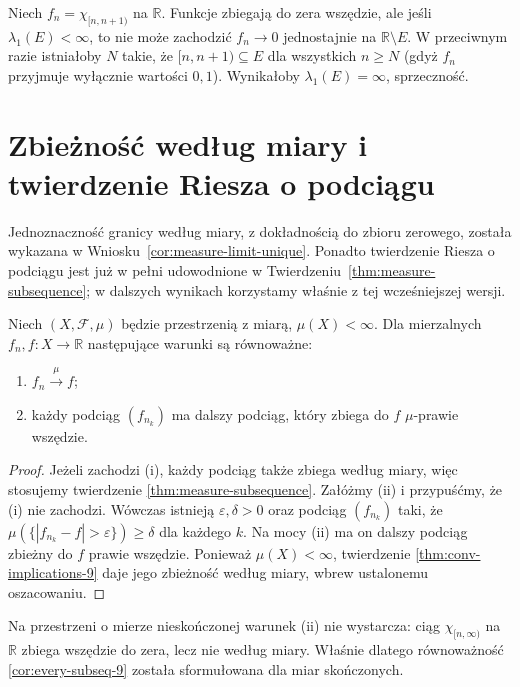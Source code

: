 \begin{przyklad}
Niech $f_n=\chi_{[n,n+1)}$ na $\mathbb R$.
Funkcje zbiegają do zera wszędzie, ale jeśli
$\lambda_1(E)<\infty$, to nie może zachodzić
$f_n\to0$ jednostajnie na $\mathbb R\setminus E$.
W przeciwnym razie istniałoby $N$ takie, że
$[n,n+1)\subseteq E$ dla wszystkich $n\ge N$
(gdyż $f_n$ przyjmuje wyłącznie wartości $0,1$).
Wynikałoby $\lambda_1(E)=\infty$, sprzeczność.
\end{przyklad}

\section{Zbieżność według miary i twierdzenie Riesza o podciągu}

Jednoznaczność granicy według miary, z dokładnością do zbioru zerowego,
została wykazana w Wniosku~\ref{cor:measure-limit-unique}.
Ponadto twierdzenie Riesza o podciągu jest już w pełni
udowodnione w Twierdzeniu~\ref{thm:measure-subsequence};
w dalszych wynikach korzystamy właśnie z tej wcześniejszej wersji.

\begin{wniosek}
\label{cor:every-subseq-9}
Niech $(X,\mathcal F,\mu)$ będzie przestrzenią z miarą,
$\mu(X)<\infty$. Dla mierzalnych
$f_n,f:X\to\mathbb R$ następujące
warunki są równoważne:
\begin{enumerate}[label=\textup{(\roman*)}]
\item $f_n\xrightarrow{\mu}f$;
\item każdy podciąg $(f_{n_k})$ ma dalszy podciąg,
który zbiega do $f$ $\mu$-prawie wszędzie.
\end{enumerate}
\end{wniosek}
\begin{proof}
Jeżeli zachodzi (i), każdy podciąg także zbiega
według miary, więc stosujemy twierdzenie
\ref{thm:measure-subsequence}.
Załóżmy (ii) i przypuśćmy, że (i) nie zachodzi.
Wówczas istnieją $\varepsilon,\delta>0$ oraz
podciąg $(f_{n_k})$ taki, że
$\mu(\{|f_{n_k}-f|>\varepsilon\})\ge\delta$
dla każdego $k$. Na mocy (ii) ma on dalszy
podciąg zbieżny do $f$ prawie wszędzie.
Ponieważ $\mu(X)<\infty$, twierdzenie
\ref{thm:conv-implications-9} daje jego zbieżność
według miary, wbrew ustalonemu oszacowaniu.
\end{proof}

\begin{uwaga}
Na przestrzeni o mierze nieskończonej warunek (ii)
nie wystarcza: ciąg $\chi_{[n,\infty)}$ na
$\mathbb R$ zbiega wszędzie do zera, lecz nie
według miary. Właśnie dlatego równoważność
\ref{cor:every-subseq-9} została sformułowana
dla miar skończonych.
\end{uwaga}

